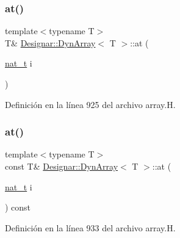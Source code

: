 \mbox{\label{class_designar_1_1_dyn_array_a117ba8cd3a9275b36d713a0ef3aef0e3}} 
\subsubsection{\texorpdfstring{at()}{at()}\hspace{0.1cm}{\footnotesize\ttfamily [1/2]}}
{\footnotesize\ttfamily template$<$typename T$>$ \\
T\& \hyperlink{class_designar_1_1_dyn_array}{Designar\+::\+Dyn\+Array}$<$ T $>$\+::at (\begin{DoxyParamCaption}\item[{\hyperlink{namespace_designar_aa72662848b9f4815e7bf31a7cf3e33d1}{nat\+\_\+t}}]{i }\end{DoxyParamCaption})\hspace{0.3cm}{\ttfamily [inline]}}



Definición en la línea 925 del archivo array.\+H.

\mbox{\label{class_designar_1_1_dyn_array_a0bb20c2467a91bad1577fae7bed15828}} 
\subsubsection{\texorpdfstring{at()}{at()}\hspace{0.1cm}{\footnotesize\ttfamily [2/2]}}
{\footnotesize\ttfamily template$<$typename T$>$ \\
const T\& \hyperlink{class_designar_1_1_dyn_array}{Designar\+::\+Dyn\+Array}$<$ T $>$\+::at (\begin{DoxyParamCaption}\item[{\hyperlink{namespace_designar_aa72662848b9f4815e7bf31a7cf3e33d1}{nat\+\_\+t}}]{i }\end{DoxyParamCaption}) const\hspace{0.3cm}{\ttfamily [inline]}}



Definición en la línea 933 del archivo array.\+H.

\mbox{\label{class_designar_1_1_dyn_array_aa8032abbe4db89827ac88aa1ea932712}} 
